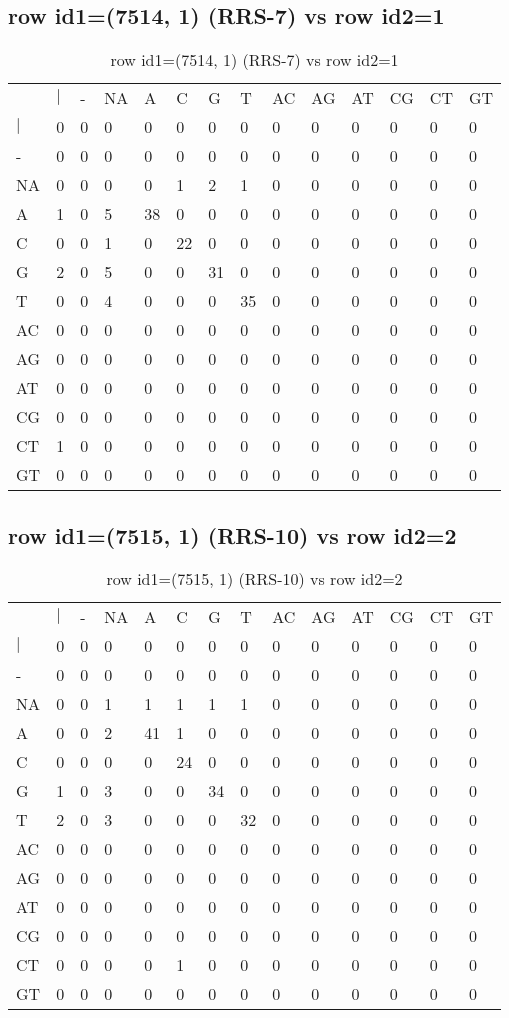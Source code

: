 \subsection{row id1=(7514, 1) (RRS-7) vs row id2=1}
\begin{center}
\begin{longtable}{|l|l|l|l|l|l|l|l|l|l|l|l|l|l|}
\caption{row id1=(7514, 1) (RRS-7) vs row id2=1} \label{table_dm316}\\
\hline
\\
\hline
&$|$&-&NA&A&C&G&T&AC&AG&AT&CG&CT&GT\\
$|$&0&0&0&0&0&0&0&0&0&0&0&0&0\\
-&0&0&0&0&0&0&0&0&0&0&0&0&0\\
NA&0&0&0&0&1&2&1&0&0&0&0&0&0\\
A&1&0&5&38&0&0&0&0&0&0&0&0&0\\
C&0&0&1&0&22&0&0&0&0&0&0&0&0\\
G&2&0&5&0&0&31&0&0&0&0&0&0&0\\
T&0&0&4&0&0&0&35&0&0&0&0&0&0\\
AC&0&0&0&0&0&0&0&0&0&0&0&0&0\\
AG&0&0&0&0&0&0&0&0&0&0&0&0&0\\
AT&0&0&0&0&0&0&0&0&0&0&0&0&0\\
CG&0&0&0&0&0&0&0&0&0&0&0&0&0\\
CT&1&0&0&0&0&0&0&0&0&0&0&0&0\\
GT&0&0&0&0&0&0&0&0&0&0&0&0&0\\
\hline
\end{longtable}
\end{center}

\subsection{row id1=(7515, 1) (RRS-10) vs row id2=2}
\begin{center}
\begin{longtable}{|l|l|l|l|l|l|l|l|l|l|l|l|l|l|}
\caption{row id1=(7515, 1) (RRS-10) vs row id2=2} \label{table_dm318}\\
\hline
\\
\hline
&$|$&-&NA&A&C&G&T&AC&AG&AT&CG&CT&GT\\
$|$&0&0&0&0&0&0&0&0&0&0&0&0&0\\
-&0&0&0&0&0&0&0&0&0&0&0&0&0\\
NA&0&0&1&1&1&1&1&0&0&0&0&0&0\\
A&0&0&2&41&1&0&0&0&0&0&0&0&0\\
C&0&0&0&0&24&0&0&0&0&0&0&0&0\\
G&1&0&3&0&0&34&0&0&0&0&0&0&0\\
T&2&0&3&0&0&0&32&0&0&0&0&0&0\\
AC&0&0&0&0&0&0&0&0&0&0&0&0&0\\
AG&0&0&0&0&0&0&0&0&0&0&0&0&0\\
AT&0&0&0&0&0&0&0&0&0&0&0&0&0\\
CG&0&0&0&0&0&0&0&0&0&0&0&0&0\\
CT&0&0&0&0&1&0&0&0&0&0&0&0&0\\
GT&0&0&0&0&0&0&0&0&0&0&0&0&0\\
\hline
\end{longtable}
\end{center}

